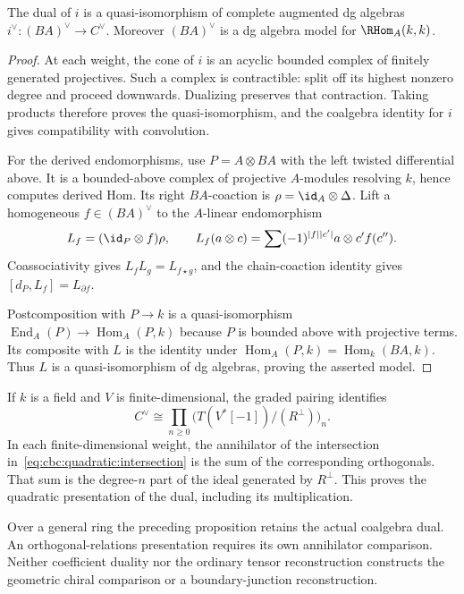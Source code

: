 \begin{proposition}\label{cbc:quadratic:coefficient-dual}
The dual of $i$ is a quasi-isomorphism of complete augmented dg algebras
$i^\vee:(BA)^\vee\to C^\vee$.
Moreover $(BA)^\vee$ is a dg algebra model for $\RHom_A(k,k)$.
\end{proposition}
\begin{proof}
At each weight, the cone of $i$ is an acyclic bounded complex of finitely generated projectives.
Such a complex is contractible: split off its highest nonzero degree and proceed downwards.
Dualizing preserves that contraction.
Taking products therefore proves the quasi-isomorphism, and the coalgebra identity for $i$ gives compatibility with convolution.

For the derived endomorphisms, use $P=A\otimes BA$ with the left twisted differential above.
It is a bounded-above complex of projective $A$-modules resolving $k$, hence computes derived Hom.
Its right $BA$-coaction is $\rho=\id_A\otimes\Delta$.
Lift a homogeneous $f\in(BA)^\vee$ to the $A$-linear endomorphism
\[
 L_f=(\id_P\otimes f)\rho,
 \qquad
 L_f(a\otimes c)=\sum(-1)^{|f||c'|}a\otimes c' f(c'').
\]
Coassociativity gives $L_fL_g=L_{f\star g}$, and the chain-coaction identity gives $[d_P,L_f]=L_{\partial f}$.

Postcomposition with $P\to k$ is a quasi-isomorphism
$\operatorname{End}_A(P)\to\operatorname{Hom}_A(P,k)$ because $P$ is bounded above with projective terms.
Its composite with $L$ is the identity under $\operatorname{Hom}_A(P,k)=\operatorname{Hom}_k(BA,k)$.
Thus $L$ is a quasi-isomorphism of dg algebras, proving the asserted model.
\end{proof}

If $k$ is a field and $V$ is finite-dimensional, the graded pairing identifies
\[
 C^\vee\cong\prod_{n\geq0}
 \bigl(T(V^*[-1])/(R^\perp)\bigr)_n.
\]
In each finite-dimensional weight, the annihilator of the intersection in~\eqref{eq:cbc:quadratic:intersection} is the sum of the corresponding orthogonals.
That sum is the degree-$n$ part of the ideal generated by $R^\perp$.
This proves the quadratic presentation of the dual, including its multiplication.

Over a general ring the preceding proposition retains the actual coalgebra dual.
An orthogonal-relations presentation requires its own annihilator comparison.
Neither coefficient duality nor the ordinary tensor reconstruction constructs the geometric chiral comparison or a boundary-junction reconstruction.

